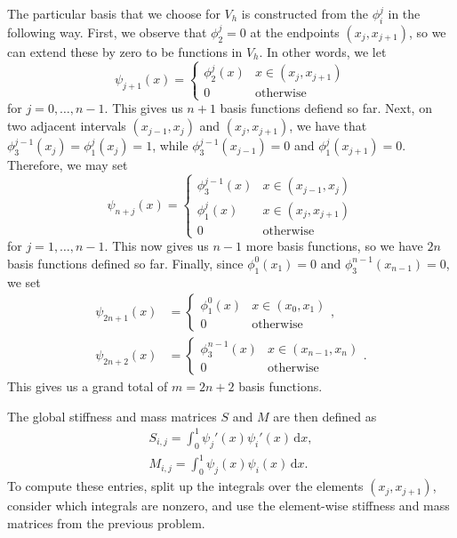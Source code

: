 \documentclass{article}
\theoremstyle{definition}
\theoremstyle{plain}
\theoremstyle{remark}
\renewcommand{\d}{\mathrm d}
\begin{document}
The particular basis that we choose for $V_h$ is constructed from the $\phi_i^j$ in the following way.
First, we observe that $\phi_2^j = 0$ at the endpoints $(x_j,x_{j+1})$, so we can extend these by zero to be functions in $V_h$.
In other words, we let
\begin{equation}
  \psi_{j+1}(x) = \begin{cases} \phi_2^j(x) & x \in (x_j,x_{j+1}) \\ 0 & \text{otherwise} \end{cases}
\end{equation}
for $j = 0,\dots,n-1$.
This gives us $n + 1$ basis functions defiend so far.
Next, on two adjacent intervals $(x_{j-1},x_j)$ and $(x_j,x_{j+1})$, we have that $\phi_3^{j-1}(x_j) = \phi_1^j(x_j) = 1$, while $\phi_3^{j-1}(x_{j-1}) = 0$ and $\phi_1^j(x_{j+1}) = 0$.
Therefore, we may set 
\begin{equation}
  \psi_{n+j}(x) = \begin{cases} \phi_3^{j-1}(x) & x \in (x_{j-1},x_j) \\ \phi_1^j(x) & x \in (x_j,x_{j+1}) \\  0 & \text{otherwise} \end{cases}
\end{equation}
for $j = 1,\dots,n-1$.
This now gives us $n-1$ more basis functions, so we have $2n$ basis functions defined so far.
Finally, since $\phi_1^0(x_1) = 0$ and $\phi_3^{n-1}(x_{n-1}) = 0$, we set 
\begin{align}
  \psi_{2n+1}(x) & = \begin{cases} \phi_1^{0}(x) & x \in (x_0,x_1) \\  0 & \text{otherwise} \end{cases}, \\
  \psi_{2n+2}(x) & = \begin{cases} \phi_3^{n-1}(x) & x \in (x_{n-1},x_n) \\  0 & \text{otherwise} \end{cases}.
\end{align}
This gives us a grand total of $m = 2n+2$ basis functions.

The global stiffness and mass matrices $S$ and $M$ are then defined as 
\begin{align}
  S_{i,j} = \int_0^1\psi_j'(x)\psi_i'(x)\,\d x, \\
  M_{i,j} = \int_0^1\psi_j(x)\psi_i(x)\,\d x.
\end{align}
To compute these entries, split up the integrals over the elements $(x_j,x_{j+1})$, consider which integrals are nonzero, and use the element-wise stiffness and mass matrices from the previous problem.
\end{document}
